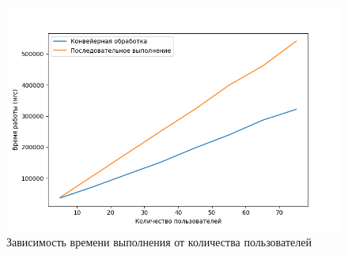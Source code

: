\documentclass[../report.tex]{subfiles}
\begin{document}
\begin{figure}[H]
	\centering
	\includegraphics[width=0.9\linewidth]{images/con_vs_serial}
	\caption{Зависимость времени выполнения от количества пользователей}
	\label{fig:graph}
\end{figure}
\end{document}
